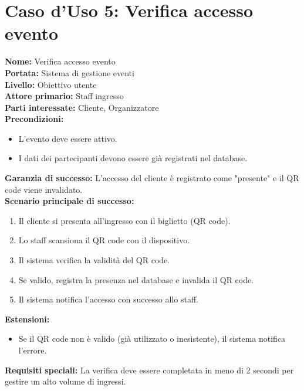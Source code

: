 \documentclass[a4paper,12pt]{article}
\begin{document}
\section*{\textcolor{sectioncolor}{Caso d'Uso 5: Verifica accesso evento}}
\textcolor{textcolor}{
\textbf{Nome:} Verifica accesso evento\\
\textbf{Portata:} Sistema di gestione eventi\\
\textbf{Livello:} Obiettivo utente\\
\textbf{Attore primario:} Staff ingresso\\
\textbf{Parti interessate:} Cliente, Organizzatore\\
\textbf{Precondizioni:}
\begin{itemize}
    \item L'evento deve essere attivo.
    \item I dati dei partecipanti devono essere già registrati nel database.
\end{itemize}
\textbf{Garanzia di successo:} L'accesso del cliente è registrato come "presente" e il QR code viene invalidato.\\
\textbf{Scenario principale di successo:}
\begin{enumerate}
    \item Il cliente si presenta all'ingresso con il biglietto (QR code).
    \item Lo staff scansiona il QR code con il dispositivo.
    \item Il sistema verifica la validità del QR code.
    \item Se valido, registra la presenza nel database e invalida il QR code.
    \item Il sistema notifica l'accesso con successo allo staff.
\end{enumerate}
\textbf{Estensioni:}
\begin{itemize}
    \item Se il QR code non è valido (già utilizzato o inesistente), il sistema notifica l'errore.
\end{itemize}
\textbf{Requisiti speciali:} La verifica deve essere completata in meno di 2 secondi per gestire un alto volume di ingressi.
}
\end{document}
